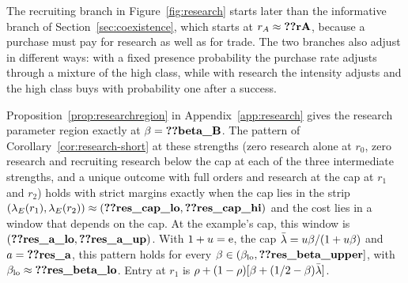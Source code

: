 The recruiting branch in Figure~\ref{fig:research} starts later than the informative branch of
Section~\ref{sec:coexistence}, which starts at \(r_A\approx\reg{rA}\), because a purchase must pay for research
as well as for trade. The two branches also adjust in different ways: with a fixed presence probability the purchase
rate adjusts through a mixture of the high class, while with research the intensity adjusts and the high class buys
with probability one after a success.

Proposition~\ref{prop:researchregion} in Appendix~\ref{app:research} gives the research
parameter region exactly at \(\beta=\reg{beta_B}\). The pattern of Corollary~\ref{cor:research-short} at these
strengths (zero research alone at \(r_0\), zero research and recruiting research below the cap at each of the three
intermediate strengths, and a unique outcome with full orders and research at the cap at \(r_1\) and \(r_2\)) holds
with strict margins exactly when the cap lies in the strip
\((\lambda_E(r_1),\lambda_E(r_2))\approx(\reg{res_cap_lo},\reg{res_cap_hi})\) and the cost lies in a window that
depends on the cap. At the example's cap, this window is \((\reg{res_a_lo},\reg{res_a_up})\). With \(1+u=\mathrm{e}\), the
cap \(\bar\lambda=u\beta/(1+u\beta)\) and \(a=\reg{res_a}\), this pattern holds for every
\(\beta\in(\beta_{\rm lo},\reg{res_beta_upper}]\), with \(\beta_{\rm lo}\approx\reg{res_beta_lo}\). Entry at \(r_1\) is \(\rho+(1-\rho)[\beta+(1/2-\beta)\bar\lambda]\).
